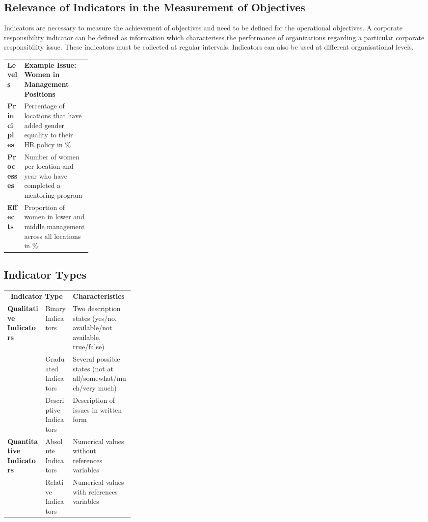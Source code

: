 \documentclass[11pt]{article}
\theoremstyle{definition}
\begin{document}
\subsection{Relevance of Indicators in the Measurement of Objectives}
Indicators are necessary to measure the achievement of objectives and need to be defined for the operational objectives. A corporate responsibility indicator can be defined as information which characterises the performance of organizations regarding a particular corporate responsibility issue. These indicators must be collected at regular intervals. Indicators can also be used at different organisational levels.
\begin{tabularx}{\linewidth}{p{0.2\linewidth} X}
	\cellcolor{DodgerBlue1!40} \textbf{Levels} & \cellcolor{DodgerBlue1!40} \textbf{Example Issue: Women in Management Positions}\\
	\textbf{Principles} & Percentage of locations that have added gender equality to their HR policy in \%\\
	\textbf{Processes} & Number of women per location and year who have completed a mentoring program\\
	\textbf{Effects} & Proportion of women in lower and middle management across all locations in \%\\
\end{tabularx}


\subsection{Indicator Types}
\begin{tabularx}{\linewidth}{p{0.3\linewidth} X X}
	\multicolumn{2}{c}{\cellcolor{DodgerBlue1!40} \textbf{Indicator Type}} & \cellcolor{DodgerBlue1!40} \textbf{Characteristics}\\
	\multirow{3}{*}{\textbf{Qualitative Indicators}} & Binary Indicators & Two description states (yes/no, available/not available, true/false)\\
	& Graduated Indicators & Several possible states (not at all/somewhat/much/very much)\\
	& Descriptive Indicators & Description of issues in written form\\
	\multirow{2}{*}{\textbf{Quantitative Indicators}} & Absolute Indicators & Numerical values without references variables\\
	& Relative Indicators & Numerical values with references variables\\
\end{tabularx}
\end{document}
